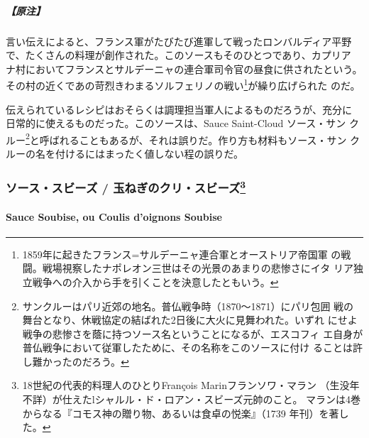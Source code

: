 \begin{recette}
\hypertarget{ux539fux6ce8-17}{%
\subparagraph{【原注】}\label{ux539fux6ce8-17}}

言い伝えによると、フランス軍がたびたび進軍して戦ったロンバルディア平野
で、たくさんの料理が創作された。このソースもそのひとつであり、カプリア
ナ村においてフランスとサルデーニャの連合軍司令官の昼食に供されたという。
その村の近くであの苛烈きわまるソルフェリノの戦い\footnote{1859年に起きたフランス=サルデーニャ連合軍とオーストリア帝国軍
  の戦闘。戦場視察したナポレオン三世はその光景のあまりの悲惨さにイタ
  リア独立戦争への介入から手を引くことを決意したともいう。}が繰り広げられた
のだ。

伝えられているレシピはおそらくは調理担当軍人によるものだろうが、充分に
日常的に使えるものだった。このソースは、Sauce Saint-Cloud ソース・サン
クルー\footnote{サンクルーはパリ近郊の地名。普仏戦争時（1870〜1871）にパリ包囲
  戦の舞台となり、休戦協定の結ばれた2日後に大火に見舞われた。いずれ
  にせよ戦争の悲惨さを蔭に持つソース名ということになるが、エスコフィ
  エ自身が普仏戦争において従軍したために、その名称をこのソースに付け
  ることは許し難かったのだろう。}と呼ばれることもあるが、それは誤りだ。作り方も材料もソース・サン
クルーの名を付けるにはまったく値しない程の誤りだ。

\maeaki

\hypertarget{ux30bdux30fcux30b9ux30b9ux30d3ux30fcux30ba-ux7389ux306dux304eux306eux30afux30eaux30b9ux30d3ux30fcux30ba137}{%
\subsubsection[ソース・スビーズ /
玉ねぎのクリ・スビーズ]{\texorpdfstring{ソース・スビーズ /
玉ねぎのクリ・スビーズ\footnote{18世紀の代表的料理人のひとりFrançois
  Marinフランソワ・マラン
  （生没年不詳）が仕えたlシャルル・ド・ロアン・スビーズ元帥のこと。
  マランは4巻からなる『コモス神の贈り物、あるいは食卓の悦楽』（1739
  年刊）を著した。}}{ソース・スビーズ / 玉ねぎのクリ・スビーズ}}\label{ux30bdux30fcux30b9ux30b9ux30d3ux30fcux30ba-ux7389ux306dux304eux306eux30afux30eaux30b9ux30d3ux30fcux30ba137}}

\hypertarget{sauce-soubise-ou-coulis-doignons-soubise}{%
\paragraph{Sauce Soubise, ou Coulis d'oignons
Soubise}\label{sauce-soubise-ou-coulis-doignons-soubise}}



\end{recette}
